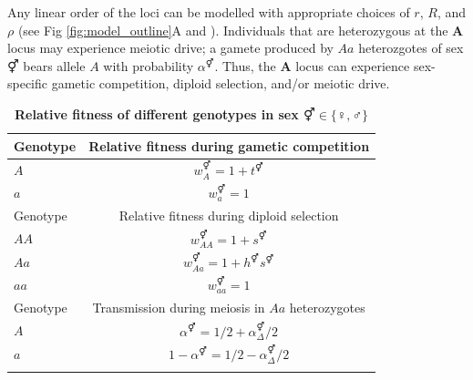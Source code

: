 \documentclass[10pt,letterpaper]{article}
\providecommand{\DIFadd}[1]{{\protect\color{blue}\uwave{#1}}} %
\providecommand{\DIFdel}[1]{{\protect\color{red}\sout{#1}}}                      %
\providecommand{\DIFaddbegin}{} %
\providecommand{\DIFaddend}{} %
\providecommand{\DIFdelbegin}{} %
\providecommand{\DIFdelend}{} %
\providecommand{\DIFaddFL}[1]{\DIFadd{#1}} %
\providecommand{\DIFdelFL}[1]{\DIFdel{#1}} %
\providecommand{\DIFaddbeginFL}{} %
\providecommand{\DIFaddendFL}{} %
\providecommand{\DIFdelbeginFL}{} %
\providecommand{\DIFdelendFL}{} %
\begin{document}
Any linear order of the loci can be modelled with appropriate choices of $r$, $R$, and $\rho$ (see Fig \ref{fig:model_outline}A and ). 
Individuals that are heterozygous at the $\mathbf{A}$ locus may experience meiotic drive; a gamete produced by $Aa$ heterozgotes of sex \DIFdelbegin \DIFdel{$\Hermaphrodite$ }\DIFdelend \DIFaddbegin \DIFadd{$\circ$ }\DIFaddend bears allele $A$ with probability \DIFdelbegin \DIFdel{$\alpha^\Hermaphrodite$}\DIFdelend \DIFaddbegin \DIFadd{$\alpha^\circ$}\DIFaddend . 
Thus, the $\mathbf{A}$ locus can experience sex-specific gametic competition, diploid selection, and/or meiotic drive. 
\DIFdelbegin %

\DIFdelend \DIFaddbegin \DIFadd{`
}\DIFaddend \begin{table}[ht]
\smallskip
\caption{{\bf Relative fitness of different genotypes in sex \DIFdelbeginFL \DIFdelFL{$\Hermaphrodite \in \{\female,\male\}$ }\DIFdelendFL \DIFaddbeginFL \DIFaddFL{$\circ \in \{\female,\male\}$ }\DIFaddendFL } }
\begin{tabular}{l c }
\hline\hline
  Genotype & Relative fitness during gametic competition \\ [0.5ex] \hline
  $A$ & \DIFdelbeginFL \DIFdelFL{$w_{A}^\Hermaphrodite = 1+t^\Hermaphrodite$ }\DIFdelendFL \DIFaddbeginFL \DIFaddFL{$w_{A}^\circ = 1+t^\circ$ }\DIFaddendFL \\
  $a$ & \DIFdelbeginFL \DIFdelFL{$w_{a}^\Hermaphrodite = 1$ }\DIFdelendFL \DIFaddbeginFL \DIFaddFL{$w_{a}^\circ = 1$ }\DIFaddendFL \\ [0.5ex] \hline
  Genotype & Relative fitness during diploid selection \\ [0.5ex] \hline
  $AA$ & \DIFdelbeginFL \DIFdelFL{$w_{AA}^\Hermaphrodite = 1+ s^\Hermaphrodite$ }\DIFdelendFL \DIFaddbeginFL \DIFaddFL{$w_{AA}^\circ = 1+ s^\circ$ }\DIFaddendFL \\
  $Aa$ & \DIFdelbeginFL \DIFdelFL{$w_{Aa}^\Hermaphrodite = 1+h^\Hermaphrodite s^\Hermaphrodite$ }\DIFdelendFL \DIFaddbeginFL \DIFaddFL{$w_{Aa}^\circ = 1+h^\circ s^\circ$ }\DIFaddendFL \\
  $aa$ & \DIFdelbeginFL \DIFdelFL{$w_{aa}^\Hermaphrodite = 1$ }\DIFdelendFL \DIFaddbeginFL \DIFaddFL{$w_{aa}^\circ = 1$ }\DIFaddendFL \\ [0.5ex] \hline
  Genotype & Transmission during meiosis in $Aa$ heterozygotes \\ [0.5ex] \hline
  $A$ & \DIFdelbeginFL \DIFdelFL{$\alpha^\Hermaphrodite=1/2+\alpha_{\Delta}^{\Hermaphrodite}/2$ }\DIFdelendFL \DIFaddbeginFL \DIFaddFL{$\alpha^\circ=1/2+\alpha_{\Delta}^{\circ}/2$ }\DIFaddendFL \\
  $a$ & \DIFdelbeginFL \DIFdelFL{$1-\alpha^\Hermaphrodite=1/2-\alpha_{\Delta}^{\Hermaphrodite}/2$ }\DIFdelendFL \DIFaddbeginFL \DIFaddFL{$1-\alpha^\circ=1/2-\alpha_{\Delta}^{\circ}/2$ }\DIFaddendFL \\
  \hline \hline
  \label{tab:fitnesstable}
 \end{tabular}
\end{table}
\end{document}
